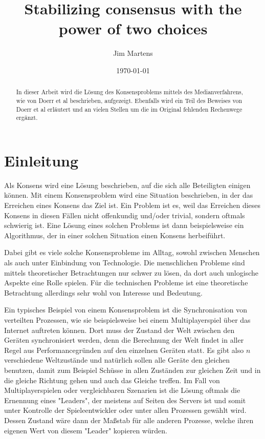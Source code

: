 \documentclass[12pt,ngerman,a4paper]{scrartcl}
\title{Stabilizing consensus with the power of two choices}
\author{Jim Martens}
\date{\today}
\theoremstyle{plain}
\theoremstyle{definition}
\theoremstyle{remark}
\begin{document}
\maketitle

\begin{abstract}
In dieser Arbeit wird die Lösung des Konsensproblems mittels des Medianverfahrens,
wie von Doerr et al\cite{Doerr2011} beschrieben, aufgezeigt. Ebenfalls wird
ein Teil des Beweises von Doerr et al erläutert und an vielen Stellen um die
im Original fehlenden Rechenwege ergänzt.
\end{abstract}

\tableofcontents

\newpage
\section{Einleitung}

Als Konsens wird eine Lösung beschrieben, auf die sich alle Beteiligten einigen
können. Mit einem Konsensproblem wird eine Situation beschrieben, in der das
Erreichen eines Konsens das Ziel ist. Ein Problem ist es, weil das Erreichen
dieses Konsens in diesen Fällen nicht offenkundig und/oder trivial, sondern
oftmals schwierig ist. Eine Lösung eines solchen Problems ist dann
beispielsweise ein Algorithmus, der in einer solchen Situation einen Konsens
herbeiführt.

Dabei gibt es viele solche Konsensprobleme im Alltag, sowohl zwischen Menschen
als auch unter Einbindung von Technologie. Die menschlichen Probleme sind
mittels theoretischer Betrachtungen nur schwer zu lösen, da dort auch unlogische
Aspekte eine Rolle spielen. Für die technischen Probleme ist eine theoretische
Betrachtung allerdings sehr wohl von Interesse und Bedeutung.

Ein typisches
Beispiel von einem Konsensproblem ist die Synchronisation von verteilten
Prozessen, wie sie beispielsweise bei einem Multiplayerspiel über das Internet
auftreten können. Dort muss der Zustand der Welt zwischen den Geräten
synchronisiert werden, denn die Berechnung der Welt findet in aller Regel aus
Performancegründen auf den einzelnen Geräten statt. Es gibt also $n$ verschiedene
Weltzustände und natürlich sollen alle Geräte den gleichen benutzen, damit
zum Beispiel Schüsse in allen Zuständen zur gleichen Zeit und in die gleiche
Richtung gehen und auch das Gleiche treffen. Im Fall von Multiplayerspielen
oder vergleichbaren Szenarien ist die Lösung oftmals die Ernennung eines "Leaders",
der meistens auf Seiten des Servers ist und somit unter Kontrolle der
Spieleentwickler oder unter allen Prozessen gewählt wird. Dessen Zustand wäre
dann der Maßstab für alle anderen Prozesse, welche ihren eigenen Wert von diesem
"Leader" kopieren würden.
\end{document}
